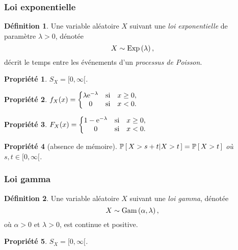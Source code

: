\documentclass[11pt]{article}
\makeatletter
\renewcommand\P[1]{%
	\ensuremath{%
		\mathbb{P}\left[\,#1\,\right]%
	}%
}%
\newcommand\Pg[2]{%
	\ensuremath{%
		\mathbb{P}\left[\,#1\middle\rvert#2\,\right]%
	}%
}%
\newcommand\e{%
	\ensuremath{%
		\mathrm{e}%
	}%
}%
\newcommand\Exp[1]{%
	\ensuremath{%
		\mathrm{Exp}\left(#1\right)%
	}%
}%
\newcommand\Gam[2]{%
	\ensuremath{%
		\mathrm{Gam}\left(#1,#2\right)%
	}%
}%
\newtheorem{property}{Propriété}
\theoremstyle{remark}
\theoremstyle{definition}
\newtheorem*{@definition}{Définition}
\newenvironment{definition}{%
	\begin{@definition}%
}{%
	\end{@definition}%
	\setcounter{property}{0}%
}
\makeatother
\begin{document}
\subsubsection{Loi exponentielle}
\begin{definition}
	Une variable aléatoire $X$ suivant une \textit{loi exponentielle} de
	paramètre $\lambda>0$, dénotée
	\begin{equation*}
		X\sim\Exp{\lambda},
	\end{equation*}
	décrit le temps entre les événements d'un \textit{processus de Poisson}.
\end{definition}

\begin{property}
	$S_X=[0,\infty[$.
\end{property}

\begin{property}
	$f_X(x)=\left\{
		\begin{matrix}
			\lambda\e^{-\lambda} & \text{si} & x\geq 0,\\
			0                    & \text{si} & x<0.\\
		\end{matrix}
	\right.$
\end{property}

\begin{property}
	$F_X(x)=\left\{
		\begin{matrix}
			1-\e^{-\lambda} & \text{si} & x\geq 0,\\
			0               & \text{si} & x<0.\\
		\end{matrix}
	\right.$
\end{property}

\begin{property}[absence de mémoire]
	$\Pg{X>s+t}{X>t}=\P{X>t}$ où $s,t\in[0,\infty[$.
\end{property}

\subsubsection{Loi gamma}
\begin{definition}
	Une variable aléatoire $X$ suivant une \textit{loi gamma}, dénotée
	\begin{equation*}
		X\sim\Gam{\alpha}{\lambda},
	\end{equation*}
	où $\alpha>0$ et $\lambda>0$, est continue et positive.
\end{definition}

\begin{property}
	$S_X=[0,\infty[$.
\end{property}
\end{document}
